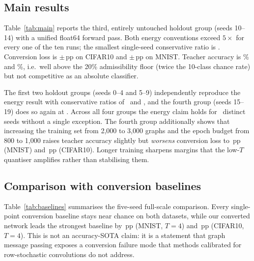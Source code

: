 \subsection{Main results}
\label{ssec:main}

Table~\ref{tab:main} reports the third, entirely untouched holdout group (seeds 10--14) with a unified float64 forward pass. Both energy conventions exceed $5\times$ for every one of the ten runs; the smallest single-seed conservative ratio is \MinCons. Conversion loss is \CIFARLoss$\pm$\CIFARLossStd\,pp on CIFAR10 and \MNISTLoss$\pm$\MNISTLossStd\,pp on MNIST. Teacher accuracy is \CIFARAnn\% and \MNISTAnn\%, i.e.\ well above the 20\% admissibility floor (twice the 10-class chance rate) but not competitive as an absolute classifier.

\begin{table}[t]
\centering
\caption{Five-seed results on untouched holdout seeds 10--14. Energy is a 45\,nm theoretical arithmetic estimate under two conventions; loss is conversion loss in percentage points (lower is better). Every one of the ten individual conservative ratios exceeds 5.464$\times$.}
\label{tab:main}

\end{table}

The first two holdout groups (seeds 0--4 and 5--9) independently reproduce the energy result with conservative ratios of \EarlierConsA\ and \EarlierConsB, and the fourth group (seeds 15--19) does so again at \FourthCons. Across all four groups the energy claim holds for \TotalSeeds\ distinct seeds without a single exception. The fourth group additionally shows that increasing the training set from 2,000 to 3,000 graphs and the epoch budget from 800 to 1,000 raises teacher accuracy slightly but \emph{worsens} conversion loss to \EIGHTEENMNISTLoss\,pp (MNIST) and \EIGHTEENCIFARLoss\,pp (CIFAR10). Longer training sharpens margins that the low-$T$ quantiser amplifies rather than stabilising them.

\subsection{Comparison with conversion baselines}
\label{ssec:comparison}

Table~\ref{tab:baselines} summarises the five-seed full-scale comparison. Every single-point conversion baseline stays near chance on both datasets, while our converted network leads the strongest baseline by \MarginMNIST\,pp (MNIST, $T{=}4$) and \MarginCIFAR\,pp (CIFAR10, $T{=}4$). This is not an accuracy-SOTA claim: it is a statement that graph message passing exposes a conversion failure mode that methods calibrated for row-stochastic convolutions do not address.

